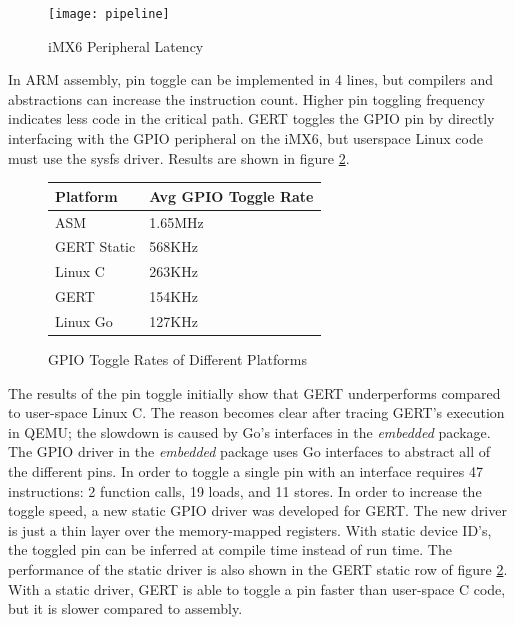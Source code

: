 \begin{figure}[h]
\begin{center}
  \texttt{[image: pipeline]}
\end{center}
  \caption{iMX6 Peripheral Latency} \label{fig:pipeline}
\end{figure}

In ARM assembly, pin toggle can be implemented in 4 lines, but compilers and 
abstractions can increase the instruction count. Higher pin
toggling frequency indicates less code in the critical path.
GERT toggles the GPIO pin by directly interfacing with the GPIO
peripheral on the iMX6, but userspace Linux code must use the
sysfs driver.
Results are shown in figure \ref{fig:toggle}.


\begin{figure} [h]
\begin{center}
  \begin{tabular}{ | l | l |}
    \hline
    Platform & Avg GPIO Toggle Rate \\ \hline
    ASM & 1.65MHz \\ \hline
    GERT Static & 568KHz \\ \hline
    Linux C & 263KHz \\ \hline
    GERT & 154KHz \\ \hline
    Linux Go & 127KHz \\
    \hline
  \end{tabular}
\end{center}
  \caption{GPIO Toggle Rates of Different Platforms}  \label{fig:toggle}
\end{figure}


The results of the pin toggle initially show that GERT underperforms compared to
user-space Linux C. The reason becomes clear after tracing GERT's execution in QEMU;
the slowdown is caused by Go's interfaces in the \textit{embedded} package. The GPIO driver
in the \textit{embedded} package uses Go interfaces to abstract all of the different pins.
In order to toggle a single pin with an interface requires 47 instructions:
2 function calls, 19 loads, and 11 stores. In order to increase the toggle speed,
a new static GPIO driver was developed for GERT. The new driver is just a thin layer
over the memory-mapped registers. With static device ID's, the toggled pin
can be inferred at compile time instead of run time.
The performance of the static driver is also shown in the GERT static row
of figure \ref{fig:toggle}. With a static driver, GERT is able to toggle a
pin faster than user-space C code, but it is slower compared to
assembly.


